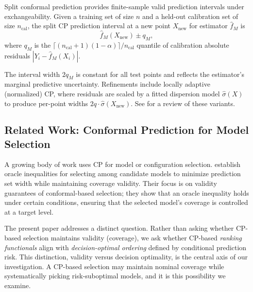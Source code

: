 \documentclass[a4paper,11pt]{article}
\begin{document}
Split conformal prediction \citep{lei2018, angelopoulos2023} provides finite-sample valid prediction intervals under exchangeability. Given a training set of size $n$ and a held-out calibration set of size $n_{\text{cal}}$, the split CP prediction interval at a new point $X_{\text{new}}$ for estimator $\hat{f}_M$ is
\begin{equation}
    \hat{f}_M(X_{\text{new}}) \pm q_M,
    \label{eq:split-cp}
\end{equation}
where $q_M$ is the $\lceil (n_{\text{cal}}+1)(1-\alpha)\rceil / n_{\text{cal}}$ quantile of calibration absolute residuals $|Y_i - \hat{f}_M(X_i)|$.

The interval width $2q_M$ is constant for all test points and reflects the estimator's marginal predictive uncertainty. Refinements include locally adaptive (normalized) CP, where residuals are scaled by a fitted dispersion model $\hat{\sigma}(X)$ to produce per-point widths $2q \cdot \hat{\sigma}(X_{\text{new}})$. See \citet{lei2018, angelopoulos2023} for a review of these variants.

\subsection{Related Work: Conformal Prediction for Model Selection}

A growing body of work uses CP for model or configuration selection. \citet{yang2024conformal} establish oracle inequalities for selecting among candidate models to minimize prediction set width while maintaining coverage validity. Their focus is on validity guarantees of conformal-based selection; they show that an oracle inequality holds under certain conditions, ensuring that the selected model's coverage is controlled at a target level.

The present paper addresses a distinct question. Rather than asking whether CP-based selection maintains validity (coverage), we ask whether CP-based \textit{ranking functionals} align with \textit{decision-optimal ordering} defined by conditional prediction risk. This distinction, validity versus decision optimality, is the central axis of our investigation. A CP-based selection may maintain nominal coverage while systematically picking risk-suboptimal models, and it is this possibility we examine.
\end{document}
